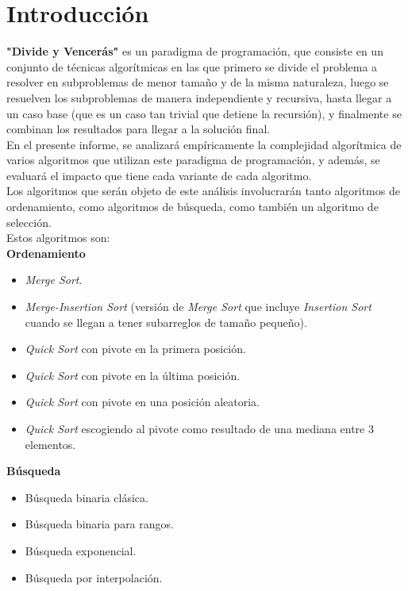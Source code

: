 \chapter{Introducción}

\textbf{"Divide y Vencerás"} es un paradigma de programación, que consiste en un conjunto de técnicas algorítmicas en las que primero se divide el problema
a resolver en subproblemas de menor tamaño y de la misma naturaleza, luego se resuelven los subproblemas de manera independiente y recursiva, 
hasta llegar a un caso base (que es un caso tan trivial que detiene la recursión), y finalmente se combinan los resultados para llegar a la solución final. \\

En el presente informe, se analizará empíricamente la complejidad algorítmica de varios algoritmos que utilizan este paradigma de programación, y además,
se evaluará el impacto que tiene cada variante de cada algoritmo. \\

Los algoritmos que serán objeto de este análisis involucrarán tanto algoritmos de ordenamiento, como algoritmos de búsqueda, como también un algoritmo de 
selección. \\

Estos algoritmos son: \\

\textbf{Ordenamiento}

\begin{itemize}
    \item \textit{Merge Sort}.
    \item \textit{Merge-Insertion Sort} (versión de \textit{Merge Sort} que incluye \textit{Insertion Sort} cuando se llegan a tener subarreglos de tamaño pequeño).
    \item \textit{Quick Sort} con pivote en la primera posición.
    \item \textit{Quick Sort} con pivote en la última posición.
    \item \textit{Quick Sort} con pivote en una posición aleatoria.
    \item \textit{Quick Sort} escogiendo al pivote como resultado de una mediana entre 3 elementos.
\end{itemize}

\textbf{Búsqueda}

\begin{itemize}
    \item Búsqueda binaria clásica.
    \item Búsqueda binaria para rangos.
    \item Búsqueda exponencial.
    \item Búsqueda por interpolación.
\end{itemize}

